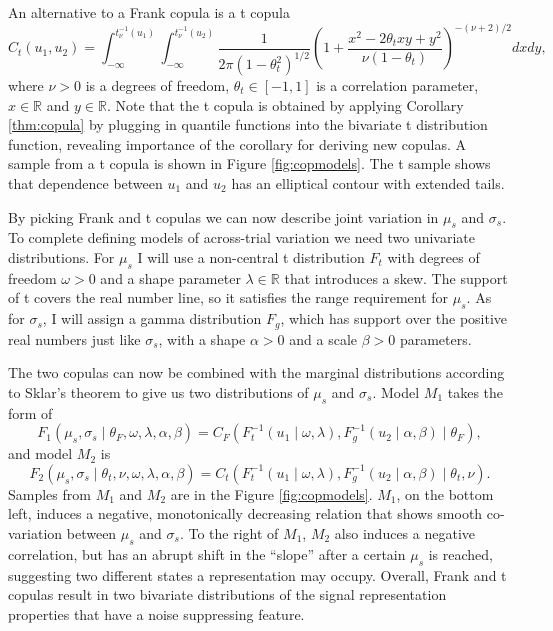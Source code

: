 \documentclass[12pt]{report}
\begin{document}
An alternative to a Frank copula is a t copula 
\begin{equation}
\label{eqn:tcop}
C_t(u_1, u_2) = \int_{-\infty}^{t_{\nu}^{-1}(u_1)}\int_{-\infty}^{t_{\nu}^{-1}(u_2)}\frac{1}{2\pi(1 - \theta_t^2)^{1/2}}\left(1+\frac{x^2-2\theta_txy+y^2}{\nu(1-\theta_t)}\right)^{-(\nu+2)/2}dxdy,
\end{equation}
where $\nu > 0$ is a degrees of freedom, $\theta_t \in [-1, 1]$ is a correlation parameter, $x \in \mathbb{R}$ and $y \in \mathbb{R}$. Note that the t copula is obtained by applying Corollary \ref{thm:copula} by plugging in quantile functions into the bivariate t distribution function, revealing importance of the corollary for deriving new copulas. A sample from a t copula is shown in Figure \ref{fig:copmodels}. The t sample shows that dependence between $u_1$ and $u_2$ has an elliptical contour with extended tails.

By picking Frank and t copulas we can now describe joint variation in $\mu_s$ and $\sigma_s$. To complete defining models of across-trial variation we need two univariate distributions. For $\mu_s$ I will use a non-central t distribution $F_t$ with degrees of freedom $\omega > 0$ and a shape parameter $\lambda \in \mathbb{R}$ that introduces a skew. The support of t covers the real number line, so it satisfies the range requirement for $\mu_s$. As for $\sigma_s$, I will assign a gamma distribution $F_g$, which has support over the positive real numbers just like $\sigma_s$, with a shape $\alpha > 0$ and a scale $\beta > 0$ parameters.

The two copulas can now be combined with the marginal distributions according to Sklar's theorem to give us two distributions of $\mu_s$ and $\sigma_s$. Model $M_1$ takes the form of
\begin{equation}
F_1(\mu_s,\sigma_s \mid \theta_F,\omega,\lambda,\alpha,\beta) = C_F(F_t^{-1}(u_1 \mid \omega,\lambda), F_g^{-1}(u_2 \mid \alpha,\beta) \mid \theta_F),
\end{equation}
and model $M_2$ is
\begin{equation}
F_2(\mu_s,\sigma_s \mid \theta_t,\nu,\omega, \lambda,\alpha,\beta) = C_t(F_t^{-1}(u_1 \mid \omega,\lambda), F_g^{-1}(u_2 \mid \alpha,\beta) \mid \theta_t, \nu).
\end{equation}
Samples from $M_1$ and $M_2$ are in the Figure \ref{fig:copmodels}. $M_1$, on the bottom left, induces a negative, monotonically decreasing relation that shows smooth co-variation between $\mu_s$ and $\sigma_s$. To the right of $M_1$, $M_2$ also induces a negative correlation, but has an abrupt shift in the ``slope'' after a certain $\mu_s$ is reached, suggesting two different states a representation may occupy. Overall, Frank and t copulas result in two bivariate distributions of the signal representation properties that have a noise suppressing feature. 
\end{document}
